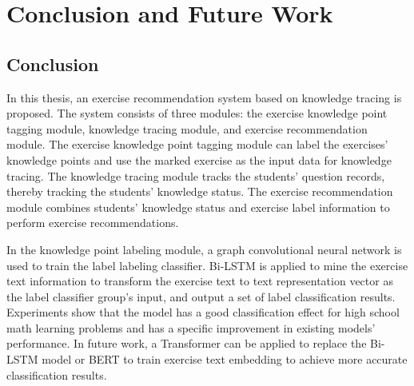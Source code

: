 \chapter{Conclusion and Future Work}
\section{Conclusion}
In this thesis, an exercise recommendation system based on knowledge tracing is proposed. The system consists of three modules: the exercise knowledge point tagging module, knowledge tracing module, and exercise recommendation module. The exercise knowledge point tagging module can label the exercises' knowledge points and use the marked exercise as the input data for knowledge tracing. The knowledge tracing module tracks the students' question records, thereby tracking the students' knowledge status. The exercise recommendation module combines students' knowledge status and exercise label information to perform exercise recommendations.


In the knowledge point labeling module, a graph convolutional neural network is used to train the label labeling classifier. Bi-LSTM is applied to mine the exercise text information to transform the exercise text to text representation vector as the label classifier group's input, and output a set of label classification results. Experiments show that the model has a good classification effect for high school math learning problems and has a specific improvement in existing models' performance. In future work, a Transformer can be applied to replace the Bi-LSTM model or BERT to train exercise text embedding to achieve more accurate classification results.

